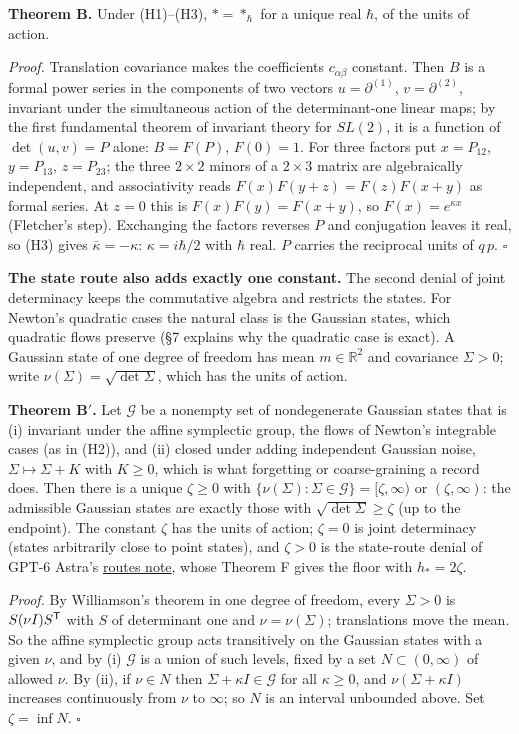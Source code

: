 \documentclass[11pt,a4paper]{article}
\begin{document}
\textbf{Theorem B.} Under (H1)--(H3), \(*=*_\hbar\) for a unique real
\(\hbar\), of the units of action.

\emph{Proof.} Translation covariance makes the coefficients
\(c_{\alpha\beta}\) constant. Then \(B\) is a formal power series in the
components of two vectors \(u=\partial^{(1)}\), \(v=\partial^{(2)}\),
invariant under the simultaneous action of the determinant-one linear
maps; by the first fundamental theorem of invariant theory for
\(SL(2)\), it is a function of \(\det(u,v)=P\) alone: \(B=F(P)\),
\(F(0)=1\). For three factors put \(x=P_{12}\), \(y=P_{13}\),
\(z=P_{23}\); the three \(2\times2\) minors of a \(2\times3\) matrix are
algebraically independent, and associativity reads
\(F(x)F(y+z)=F(z)F(x+y)\) as formal series. At \(z=0\) this is
\(F(x)F(y)=F(x+y)\), so \(F(x)=e^{\kappa x}\) (Fletcher's step).
Exchanging the factors reverses \(P\) and conjugation leaves it real, so
(H3) gives \(\bar\kappa=-\kappa\): \(\kappa=i\hbar/2\) with \(\hbar\)
real. \(P\) carries the reciprocal units of \(q\,p\). \(\square\)

\textbf{The state route also adds exactly one constant.} The second
denial of joint determinacy keeps the commutative algebra and restricts
the states. For Newton's quadratic cases the natural class is the
Gaussian states, which quadratic flows preserve (§7 explains why the
quadratic case is exact). A Gaussian state of one degree of freedom has
mean \(m\in\mathbb R^2\) and covariance \(\Sigma>0\); write
\(\nu(\Sigma)=\sqrt{\det\Sigma}\), which has the units of action.

\textbf{Theorem B\('\).} Let \(\mathcal G\) be a nonempty set of
nondegenerate Gaussian states that is (i) invariant under the affine
symplectic group, the flows of Newton's integrable cases (as in (H2)),
and (ii) closed under adding independent Gaussian noise,
\(\Sigma\mapsto\Sigma+K\) with \(K\ge0\), which is what forgetting or
coarse-graining a record does. Then there is a unique \(\zeta\ge0\) with
\(\{\nu(\Sigma):\Sigma\in\mathcal G\}=[\zeta,\infty)\) or
\((\zeta,\infty)\): the admissible Gaussian states are exactly those
with \(\sqrt{\det\Sigma}\ge\zeta\) (up to the endpoint). The constant
\(\zeta\) has the units of action; \(\zeta=0\) is joint determinacy
(states arbitrarily close to point states), and \(\zeta>0\) is the
state-route denial of GPT-6 Astra's
\href{newton-indeterminacy-routes.md}{routes note}, whose Theorem F
gives the floor with \(h_*=2\zeta\).

\emph{Proof.} By Williamson's theorem in one degree of freedom, every
\(\Sigma>0\) is \(S(\nu I)S^{\sf T}\) with \(S\) of determinant one and
\(\nu=\nu(\Sigma)\); translations move the mean. So the affine
symplectic group acts transitively on the Gaussian states with a given
\(\nu\), and by (i) \(\mathcal G\) is a union of such levels, fixed by a
set \(N\subset(0,\infty)\) of allowed \(\nu\). By (ii), if \(\nu\in N\)
then \(\Sigma+\kappa I\in\mathcal G\) for all \(\kappa\ge0\), and
\(\nu(\Sigma+\kappa I)\) increases continuously from \(\nu\) to
\(\infty\); so \(N\) is an interval unbounded above. Set
\(\zeta=\inf N\). \(\square\)
\end{document}
